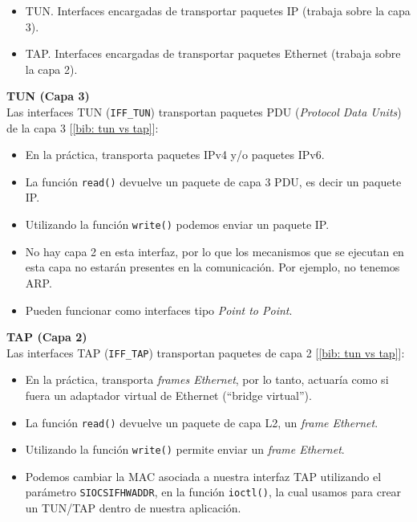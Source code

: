 \documentclass[a4paper, oneside, 12pt]{book}
\begin{document}
	\begin{itemize}
		\item TUN. Interfaces encargadas de transportar paquetes IP (trabaja sobre la capa 3).
		\item TAP. Interfaces encargadas de transportar paquetes Ethernet (trabaja sobre la capa 2).
	\end{itemize}
	
	\vspace{5px}

	\noindent \textbf{\large TUN (Capa 3)}\\
	
	\noindent Las interfaces TUN (\texttt{IFF\_TUN}) transportan paquetes PDU (\textit{Protocol Data Units}) de la capa 3 [\ref{bib: tun vs tap}]:
	\begin{itemize}
		\item En la práctica, transporta paquetes IPv4 y/o paquetes IPv6.
		\item La función \texttt{read()} devuelve un paquete de capa 3 PDU, es decir un paquete IP.
		\item Utilizando la función \texttt{write()} podemos enviar un paquete IP.
		\item No hay capa 2 en esta interfaz, por lo que los mecanismos que se ejecutan en esta capa no estarán presentes en la comunicación. Por ejemplo, no tenemos ARP.
		\item Pueden funcionar como interfaces tipo \textit{Point to Point}.
	\end{itemize}
	
	\pagebreak
	
	\noindent \textbf{\large TAP (Capa 2)}\\
	
	\noindent Las interfaces TAP (\texttt{IFF\_TAP}) transportan paquetes de capa 2 [\ref{bib: tun vs tap}]: 
	\begin{itemize}
		\item En la práctica, transporta \textit{frames Ethernet}, por lo tanto, actuaría como si fuera un adaptador virtual de Ethernet (``bridge virtual'').
		\item La función \texttt{read()} devuelve un paquete de capa L2, un \textit{frame Ethernet}.
		\item Utilizando la función \texttt{write()} permite enviar un \textit{frame Ethernet}.
		\item Podemos cambiar la MAC asociada a nuestra interfaz TAP utilizando el parámetro \texttt{SIOCSIFHWADDR}, en la función \texttt{ioctl()}, la cual usamos para crear un TUN/TAP dentro de nuestra aplicación.
	\end{itemize}
\end{document}
